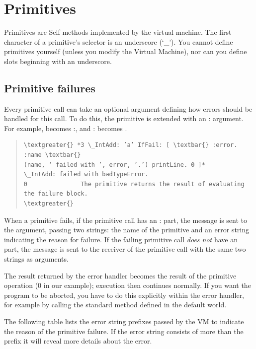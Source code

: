 \documentclass[letterpaper,10pt,english]{sphinxmanual}
\begin{document}
\section{Primitives}
\label{primitives:primitives}\label{primitives::doc}
Primitives are Self methods implemented by the virtual machine. The first character of a primitive’s
selector is an underscore (‘\_’). You cannot define primitives yourself (unless you modify the
Virtual Machine), nor can you define slots beginning with an underscore.


\subsection{Primitive failures}
\label{primitives:primitive-failures}
Every primitive call can take an optional argument defining how errors should be handled for this
call. To do this, the primitive is extended with an : argument. For example, 
becomes :, and : becomes .
\begin{quote}

\begin{Verbatim}[commandchars=\\\{\}]
\textgreater{} *3 \_IntAdd: ’a’ IfFail: [ \textbar{} :error. :name \textbar{}
(name, ’ failed with ’, error, ’.’) printLine. 0 ]*
\_IntAdd: failed with badTypeError.
0               The primitive returns the result of evaluating the failure block.
\textgreater{}
\end{Verbatim}
\end{quote}

When a primitive fails, if the primitive call has an : part, the message  is
sent to the  argument, passing two strings: the name of the primitive and an error string
indicating the reason for failure. If the failing primitive call \emph{does not} have an  part, the
message  is sent to the receiver of the primitive call with the same two
strings as arguments.

The result returned by the error handler becomes the result of the primitive operation (0 in our example);
execution then continues normally. If you want the program to be aborted, you have to do
this explicitly within the error handler, for example by calling the standard  method defined
in the default world.

The following table lists the error string prefixes passed by the VM to indicate the reason of the
primitive failure. If the error string consists of more than the prefix it will reveal more details about
the error.
\end{document}
